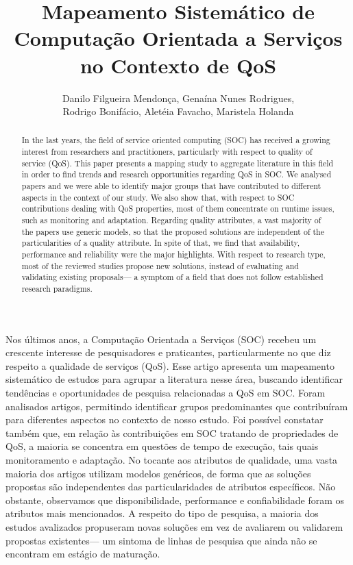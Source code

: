 \documentclass[12pt]{article}
\title{Mapeamento Sistem\'{a}tico de Computa\c{c}\~{a}o Orientada a Servi\c{c}os no Contexto de QoS}
\author{Danilo Filgueira Mendon\c{c}a\inst{1}, Gena\'{i}na Nunes Rodrigues\inst{1}, \\ Rodrigo Bonif\'{a}cio\inst{1}, Alet\'{e}ia Favacho\inst{1}, Maristela Holanda\inst{1} }
\begin{document}
 



\maketitle

\begin{abstract}

In the last years, the field of service oriented computing (SOC) has received a growing interest from researchers and practitioners, particularly with respect to quality of service (QoS). This paper presents a mapping study to aggregate literature in this field in order to find trends and research opportunities regarding QoS in SOC. We analysed \AcceptedPubs papers and we were able to identify major groups that have contributed to different aspects in the context of our study. We also show that, with respect to SOC contributions dealing with QoS properties, most of them concentrate on runtime issues, such as monitoring and adaptation. Regarding quality attributes, a vast majority of the papers use generic models, so that the proposed solutions are independent of the particularities of a quality attribute. In spite of that, we find that availability, performance and reliability were the major highlights. With respect to research type, most of the reviewed studies propose new solutions, instead of evaluating and validating existing proposals--- a symptom of a field that does not follow established research paradigms.
\end{abstract}

\begin{resumo}
Nos últimos anos, a Computação Orientada a Serviços (SOC) recebeu um crescente interesse de pesquisadores e praticantes, particularmente no que diz respeito a qualidade de serviços (QoS). Esse artigo apresenta um mapeamento sistem\'{a}tico de estudos para agrupar a literatura nesse \'{a}rea, buscando  identificar tendências e oportunidades de pesquisa relacionadas a QoS em SOC. Foram analisados \AcceptedPubs artigos, permitindo identificar grupos predominantes que contribuíram para diferentes aspectos no contexto de nosso estudo. Foi poss\'{i}vel constatar tamb\'{e}m que, em relação às contribuições em SOC tratando de propriedades de QoS, a maioria se concentra em questões de tempo de execução, tais quais monitoramento e adaptação. No tocante aos atributos de qualidade, uma vasta maioria dos artigos utilizam modelos genéricos, de forma que as soluções propostas são independentes das particularidades de atributos 
espec\'{i}ficos. Não obstante, observamos que disponibilidade, performance e confiabilidade foram os atributos mais mencionados. A respeito do tipo de pesquisa, a maioria dos estudos avalizados propuseram novas soluções em vez de avaliarem ou validarem propostas existentes--- um sintoma 
de linhas de pesquisa que ainda n\~{a}o se encontram em est\'{a}gio de matura\c c\~{a}o.
  
\end{resumo}



    











\end{document}
